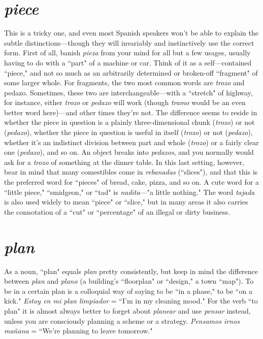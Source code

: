 \section{\emph{piece}}

This is a tricky one, and even most Spanish speakers won't be
able to explain the subtle distinctions---though they will invariably
and instinctively use the correct form. First of all, banish \emph{pieza} from
your mind for all but a few usages, usually having to do with a ``part"
of a machine or car. Think of it as a self---contained ``piece," and not so
much as an arbitrarily determined or broken-off ``fragment" of some
larger whole.
For fragments, the two most common words are \emph{trozo} and
pedazo. Sometimes, these two are interchangeable---with a ``stretch"
of highway, for instance, either \emph{trozo} or \emph{pedazo} will work (though
\emph{tramo} would be an even better word here)---and other times they're
not. The difference seems to reside in whether the piece in question is
a plainly three-dimensional chunk (\emph{trozo}) or not (\emph{pedazo}), whether the
piece in question is useful in itself (\emph{trozo}) or not (\emph{pedazo}), whether it's
an indistinct division between part and whole (\emph{trozo}) or a fairly clear
one (\emph{pedazo}), and so on. An object breaks into \emph{pedazos}, and you normally would ask for a \emph{trozo} of something at the dinner table.
In this last setting, however, bear in mind that many comestibles come in \emph{rebanadas} (``slices"), and that this is the preferred word
for ``pieces" of bread, cake, pizza, and so on. A cute word for a ``little
piece," ``smidgeon," or ``tad" is \emph{nadita}---"a little nothing." The word
\emph{tajada} is also used widely to mean ``piece" or ``slice," but in many
areas it also carries the connotation of a ``cut" or ``percentage" of an
illegal or dirty business.

\section{\emph{plan}}

As a noun, ``plan" equals \emph{plan} pretty consistently, but keep in
mind the difference between \emph{plan} and \emph{plano} (a building's ``floorplan"
or ``design," a town ``map"). To be in a certain plan is a colloquial way
of saying to be ``in a phase," to be ``on a kick." \emph{Estoy en mi plan limpiador} = ``I'm in my cleaning mood." For the verb ``to plan" it is almost always better to forget about \emph{planear} and use \emph{pensar} instead,
unless you are consciously planning a scheme or a strategy. \emph{Pensamos
irnos mañana} = ``We're planning to leave tomorrow."

